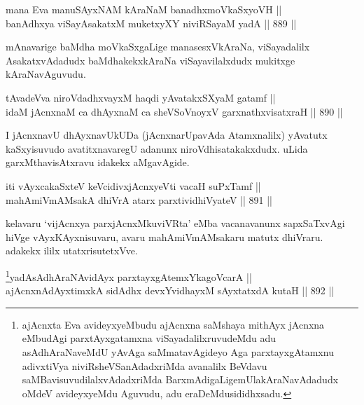 \begin{shl}
mana Eva manuSAyxNAM kAraNaM banadhxmoVkaSxyoVH || \\
banAdhxya viSayAsakatxM muketxyXY niviRSayaM yadA \hfill || 889 ||  
\end{shl}

\begin{artha}
mAnavarige baMdha moVkaSxgaLige manasesxVkAraNa, viSayadalilx AsakatxvAdadudx baMdhakekxkAraNa viSayavilalxdudx mukitxge kAraNavAguvudu.
\end{artha}


\begin{shl}
tAvadeVva niroVdadhxvayxM haqdi yAvatakxSXyaM gatamf || \\
idaM jAcnxnaM ca dhAyxnaM ca sheVSoV\s noyxV garxnathxvisatxraH \hfill || 890 ||  
\end{shl}

\begin{artha}
I jAcnxnavU dhAyxnavUkUDa (jAcnxnarUpavAda Atamxnalilx) yAvatutx kaSxyisuvudo avatitxnavaregU adanunx niroVdhisatakakxdudx. uLida garxMthavisAtxravu idakekx aMgavAgide.
\end{artha}


\begin{shl}
iti vAyxcakaSxteV keVcidivxjAcnxyeVti vacaH suPxTamf || \\
mahAmiVmAMsakA dhiVrA atarx parxtividhiVyateV \hfill || 891 ||  
\end{shl}

\begin{artha}
kelavaru `vijAcnxya parxjAcnxMkuviVRta' eMba vacanavanunx sapxSaTxvAgi hiVge vAyxKAyxnisuvaru, avaru mahAmiVmAMsakaru matutx dhiVraru. adakekx ililx utatxrisutetxVve.
\end{artha}



\begin{shl}
\footnote{ajAcnxta Eva avideyxyeMbudu ajAcnxna saMshaya mithAyx jAcnxna eMbudAgi parxtAyxgatamxna viSayadalilxruvudeMdu adu asAdhAraNaveMdU yAvAga saMmatavAgideyo Aga parxtayxgAtamxnu adivxtiVya niviRsheVSanAdadxriMda avanalilx BeVdavu saMBavisuvudilalxvAdadxriMda BarxmAdigaLige\break mUlakAraNavAdadudx oMdeV avideyxyeMdu Aguvudu, adu eraDeMdusididhxsadu.}yadA\s sAdhAraNA\s vidAyx parxtayxgAtemxYkagoVcarA || \\
ajAcnxnAdAyxtimxkA sidAdhx devxYvidhayxM sAyxtatxdA kutaH \hfill || 892 ||  
\end{shl}

